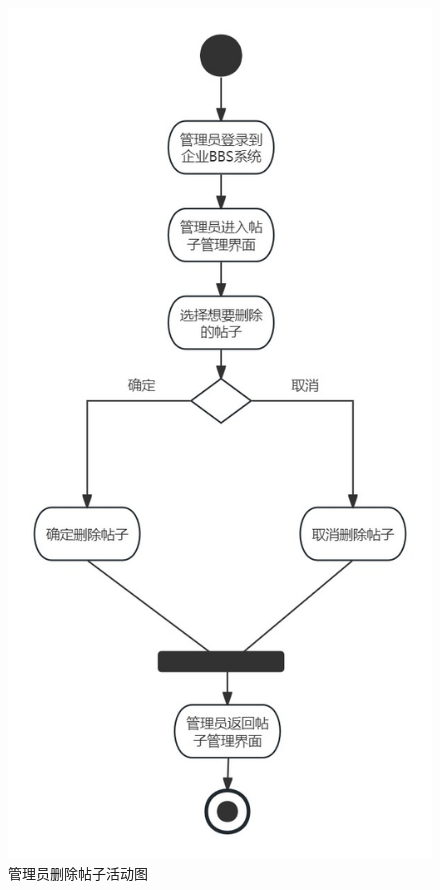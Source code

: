\documentclass[UTF8]{ctexart}
\begin{document}
\begin{figure}[H]
  \centering
  \includegraphics[scale=0.25]{活动图/管理员删除帖子活动图.jpg}
  \caption{管理员删除帖子活动图}
\end{figure}
\end{document}

